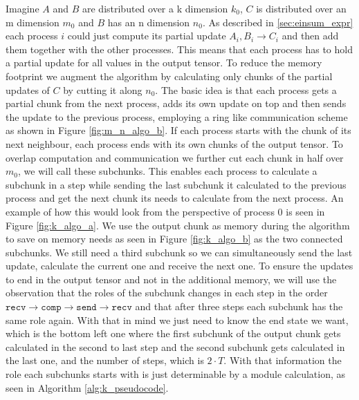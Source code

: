 Imagine $A$ and $B$ are distributed over a k dimension $k_0$, $C$ is distributed over an m dimension $m_0$ and $B$ has an n dimension $n_0$.
As described in \ref{sec:einsum_expr} each process $i$ could just compute its partial update $A_i, B_i \rightarrow C_i$ and then add them together with the other processes.
This means that each process has to hold a partial update for all values in the output tensor.
To reduce the memory footprint we augment the algorithm by calculating only chunks of the partial updates of $C$ by cutting it along $n_0$.
The basic idea is that each process gets a partial chunk from the next process, adds its own update on top and then sends the update to the previous process, employing a ring like communication scheme as shown in Figure \ref{fig:m_n_algo_b}.
If each process starts with the chunk of its next neighbour, each process ends with its own chunks of the output tensor.
To overlap computation and communication we further cut each chunk in half over $m_0$, we will call these subchunks.
This enables each process to calculate a subchunk in a step while sending the last subchunk it calculated to the previous process and get the next chunk its needs to calculate from the next process.
An example of how this would look from the perspective of process $0$ is seen in Figure \ref{fig:k_algo_a}.
We use the output chunk as memory during the algorithm to save on memory needs as seen in Figure \ref{fig:k_algo_b} as the two connected subchunks.
We still need a third subchunk so we can simultaneously send the last update, calculate the current one and receive the next one.
To ensure the updates to end in the output tensor and not in the additional memory, we will use the observation that the roles of the subchunk changes in each step in the order $\texttt{recv} \rightarrow \texttt{comp} \rightarrow \texttt{send} \rightarrow \texttt{recv}$ and that after three steps each subchunk has the same role again.
With that in mind we just need to know the end state we want, which is the bottom left one where the first subchunk of the output chunk gets calculated in the second to last step and the second subchunk gets calculated in the last one, and the number of steps, which is $2 \cdot T$.
With that information the role each subchunks starts with is just determinable by a module calculation, as seen in Algorithm \ref{alg:k_pseudocode}.

